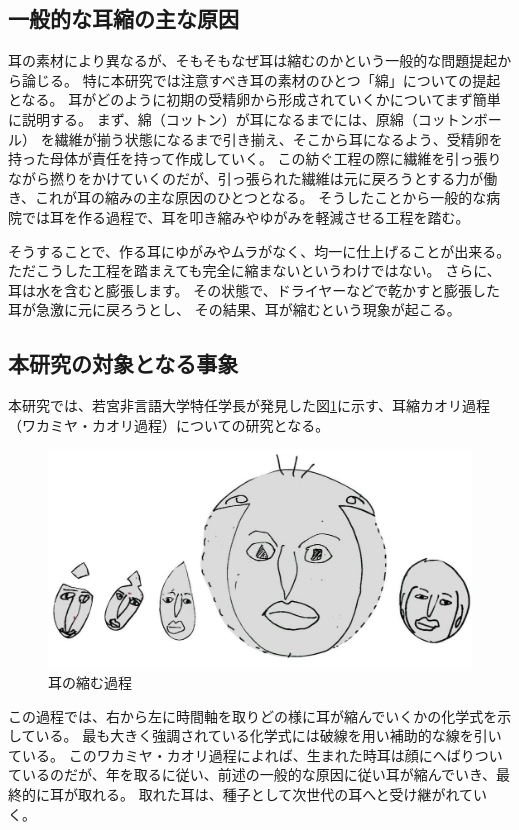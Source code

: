\documentclass[12pt]{jsarticle}
\begin{document}
\subsection{一般的な耳縮の主な原因}
耳の素材により異なるが、そもそもなぜ耳は縮むのかという一般的な問題提起から論じる。
特に本研究では注意すべき耳の素材のひとつ「綿」についての提起となる。
耳がどのように初期の受精卵から形成されていくかについてまず簡単に説明する。
まず、綿（コットン）が耳になるまでには、原綿（コットンボール） を繊維が揃う状態になるまで引き揃え、そこから耳になるよう、受精卵を持った母体が責任を持って作成していく。
この紡ぐ工程の際に繊維を引っ張りながら撚りをかけていくのだが、引っ張られた繊維は元に戻ろうとする力が働き、これが耳の縮みの主な原因のひとつとなる。
そうしたことから一般的な病院では耳を作る過程で、耳を叩き縮みやゆがみを軽減させる工程を踏む。\par

そうすることで、作る耳にゆがみやムラがなく、均一に仕上げることが出来る。
ただこうした工程を踏まえても完全に縮まないというわけではない。
さらに、耳は水を含むと膨張します。
その状態で、ドライヤーなどで乾かすと膨張した耳が急激に元に戻ろうとし、
その結果、耳が縮むという現象が起こる。

\subsection{本研究の対象となる事象}
本研究では、若宮非言語大学特任学長が発見した図\ref{mimi}に示す、耳縮カオリ過程（ワカミヤ・カオリ過程）についての研究となる。
\begin{figure}
\centering
\includegraphics[scale=0.3]{figure/mimi}
\caption{耳の縮む過程}
\label{mimi}
\end{figure}
この過程では、右から左に時間軸を取りどの様に耳が縮んでいくかの化学式を示している。
最も大きく強調されている化学式には破線を用い補助的な線を引いている。
このワカミヤ・カオリ過程によれば、生まれた時耳は顔にへばりついているのだが、年を取るに従い、前述の一般的な原因に従い耳が縮んでいき、最終的に耳が取れる。
取れた耳は、種子として次世代の耳へと受け継がれていく。
\end{document}
